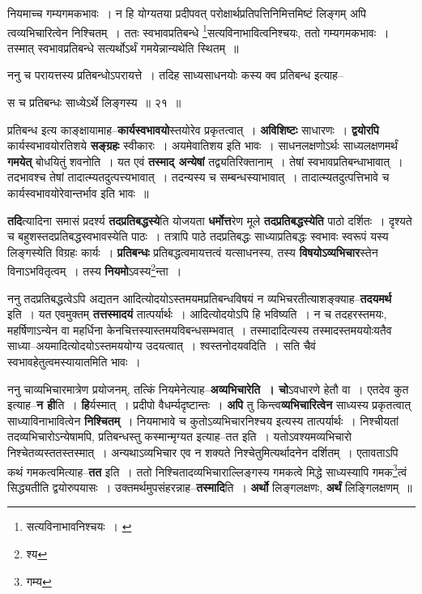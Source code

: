 \documentclass[article,12pt,a4paper]{memoir}
\begin{document}
	  \pstart नियमाच्च गम्यगमकभावः । न हि योग्यतया प्रदीपवत् परोक्षार्थप्रतिपत्तिनिमित्तमिष्टं लिङ्गम् अपि त्वव्यभिचारित्वेन निश्चितम् । ततः स्वभावप्रतिबन्धे \footnote{सत्यविनाभावनिश्चयः । \cite{dp-msA} \cite{dp-edP} \cite{dp-edH} \cite{dp-edE} \cite{dp-edN}}सत्यविनाभावित्वनिश्चयः, ततो गम्यगमकभावः । तस्मात् स्वभावप्रतिबन्धे सत्यर्थोऽर्थं गमयेन्नान्यथेति स्थितम् ॥
	\pend
       

	  \pstart ननु च परायत्तस्य प्रतिबन्धोऽपरायत्ते । तदिह साध्यसाधनयोः कस्य क्व प्रतिबन्ध इत्याह--
	\pend
      
	  \endgroup
	
	  \bigskip
	  \begingroup
	

	  \pstart स च प्रतिबन्धः साध्येऽर्थे लिङ्गस्य ॥ २१ ॥
	\pend
      
	  \endgroup
	

	  \pstart प्रतिबन्ध इत्य काङ्क्षायामाह--\textbf{कार्यस्वभावयो}स्तयोरेव प्रकृतत्वात् । \textbf{अविशिष्टः} साधारणः । \textbf{द्वयोरपि} कार्यस्वभावयोरतिशये \textbf{सङ्ग्रहः} स्वीकारः । अयमेवातिशय इति भावः । साधनलक्षणोऽर्थः साध्यलक्षणमर्थं \textbf{गमयेत्} बोधयितुं शवनोति । यत एवं \textbf{तस्माद् अन्येषां} तद्व्यतिरिक्तानाम् । तेषां स्वभावप्रतिबन्धाभावात् । तदभावश्च तेषां तादात्म्यतदुत्पत्त्यभावात् । तदन्यस्य च सम्बन्धस्याभावात् । तादात्म्यतदुत्पत्तिभावे च कार्यस्वभावयोरेवान्तर्भाव इति भावः ॥
	\pend
      

	  \pstart \textbf{तदि}त्यादिना समासं प्रदर्श्य \textbf{तदप्रतिबद्धस्ये}ति योजयता \textbf{धर्मोत्त}रेण मूले \textbf{तदप्रतिबद्धस्येति} पाठो दर्शितः । दृश्यते च बहुशस्तदप्रतिबद्धस्वभावस्येति पाठः । तत्रापि पाठे तदप्रतिबद्धः साध्याप्रतिबद्धः स्वभावः स्वरूपं यस्य लिङ्गस्येति विग्रहः कार्यः । \textbf{प्रतिबन्धः} प्रतिबद्धत्वमायत्तत्वं यत्साधनस्य, तस्य \textbf{विषयोऽव्यभिचार}स्तेन विनाऽभवितृत्वम् । तस्य \textbf{नियमो}ऽवस्य\footnote{श्य}न्ता ।
	\pend
      

	  \pstart ननु तदप्रतिबद्धत्वेऽपि अद्यतन आदित्योदयोऽस्तमयमप्रतिबन्धविषयं न व्यभिचरतीत्याशङ्क्याह--\textbf{तदयमर्थ} इति । यत एवमुक्तम् \textbf{तत्तस्मादयं} तात्पर्यार्थः । आदित्योदयोऽपि हि भविष्यति । न च तदहरस्तमयः, महर्षिणाऽन्येन वा महर्धिना केनचित्तस्यास्तमयविबन्धसम्भवात् । तस्मादादित्यस्य तस्मादस्तमययोःयतैव साध्या--अयमादित्योदयोऽस्तमययोग्य उदयत्वात् । श्वस्तनोदयवदिति । सति चैवं स्वभावहेतुत्वमस्यायातमिति भावः ।
	\pend
      

	  \pstart ननु चाव्यभिचारमात्रेण प्रयोजनम्, तत्किं नियमेनेत्याह--\textbf{अव्यभिचारेति । चो}ऽवधारणे हेतौ वा । एतदेव कुत इत्याह--\textbf{न ही}ति । \leavevmode{} \textbf{हि}र्यस्मात् । प्रदीपो वैधर्म्यदृष्टान्तः । \textbf{अपि} तु किन्त्व\textbf{व्यभिचारित्वेन} साध्यस्य प्रकृतत्वात् साध्याविनाभावित्वेन \textbf{निश्चितम्} । नियमाभावे च कुतोऽव्यभिचारनिश्चय इत्यस्य तात्पर्यार्थः । निश्चीयतां तदव्यभिचारोऽन्येषामपि, प्रतिबन्धस्तु कस्मान्मृग्यत इत्याह--तत इति । यतोऽवश्यमव्यभिचारो निश्चेतव्यस्ततस्तस्मात् । अन्यथाऽव्यभिचार एव न शक्यते निश्चेतुमित्यर्थादनेन दर्शितम् । एतावताऽपि कथं गमकत्वमित्याह--\textbf{तत} इति । ततो निश्चितादव्यभिचाराल्लिङ्गस्य गमकत्वे मिद्धे साध्यस्यापि गमक\footnote{गम्य}त्वं सिद्ध्यतीति द्वयोरुपयासः । उक्तमर्थमुपसंहरन्नाह--\textbf{तस्मादि}ति । \textbf{अर्थो} लिङ्गलक्षणः, \textbf{अर्थं} लिङ्गिलक्षणम् ॥
	\pend
      
\end{document}
